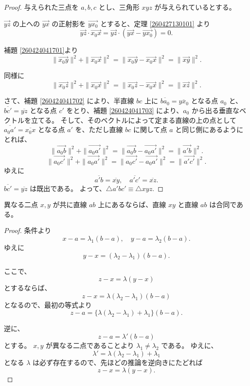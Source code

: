 \begin{proof}
  与えられた三点を \(a,b,c\) とし、三角形 \(xyz\) が与えられているとする。

  \(\overrightarrow{yz}\) の上への \(\overrightarrow{yx}\) の正射影を \(\overrightarrow{yx_0}\) とすると、定理 \ref{260427130101} より
  \[\overrightarrow{yz}\cdot\overrightarrow{x_0x}=\overrightarrow{yz}\cdot(\overrightarrow{yx}-\overrightarrow{yx_0})=0.\]

  補題 \ref{260424041701}より
  \[\|\overrightarrow{x_0y}\|^2+\|\overrightarrow{x_0x}\|^2=\|\overrightarrow{x_0y}-\overrightarrow{x_0x}\|^2=\|\overrightarrow{xy}\|^2.\]

  同様に
  \[\|\overrightarrow{x_0z}\|^2+\|\overrightarrow{x_0x}\|^2=\|\overrightarrow{x_0z}-\overrightarrow{x_0x}\|^2=\|\overrightarrow{xz}\|^2.\]

  さて、補題 \ref{260424041702} により、半直線 \(bc\) 上に \(\overline{ba_0}=\overline{yx_0}\) となる点 \(a_0\) と、\(\overline{bc'}=\overline{yz}\) となる点 \(c'\) をとり、補題 \ref{260424041703} により、\(a_0\) から出る垂直なベクトルを立てる。
  そして、そのベクトルによって定まる直線の上の点として \(\overline{a_0a'}=\overline{x_0x}\) となる点 \(a'\) を、ただし直線 \(bc\) に関して点 \(a\) と同じ側にあるようにとれば、
  \[\|\overrightarrow{a_0b}\|^2+\|\overrightarrow{a_0a'}\|^2=\|\overrightarrow{a_0b}-\overrightarrow{a_0a'}\|^2=\|\overrightarrow{a'b}\|^2.\]
  \[\|\overrightarrow{a_0c'}\|^2+\|\overrightarrow{a_0a'}\|^2=\|\overrightarrow{a_0c'}-\overrightarrow{a_0a'}\|^2=\|\overrightarrow{a'c'}\|^2.\]
  ゆえに
  \[\overline{a'b}=\overline{xy},\quad \overline{a'c'}=\overline{xz}.\]
  \(\overline{bc'}=\overline{yz}\) は既出である。
  よって、\(\triangle a'bc'\equiv\triangle xyz.\)
\end{proof}


\begin{lmm}\label{260424111401}
  異なる二点 \(x,y\) が共に直線 \(ab\) 上にあるならば、直線 \(xy\) と直線 \(ab\) は合同である。
\end{lmm}

\begin{proof}
  条件より
  \[x-a=\lambda_1(b-a),\quad y-a=\lambda_2(b-a).\]
  ゆえに
  \[y-x=(\lambda_2-\lambda_1)(b-a).\]

  ここで、
  \[z-x=\lambda(y-x)\]
  とするならば、
  \[z-x=\lambda(\lambda_2-\lambda_1)(b-a)\]
  となるので、最初の等式より
  \[z-a=\{\lambda(\lambda_2-\lambda_1)+\lambda_1\}(b-a).\]

  逆に、
  \[z-a=\lambda'(b-a)\]
  とする。
  \(x,y\) が異なる二点であることより \(\lambda_1\neq\lambda_2\) である。
  ゆえに、
  \[\lambda'=\lambda(\lambda_2-\lambda_1)+\lambda_1\]
  となる \(\lambda\) は必ず存在するので、先ほどの推論を逆向きにたどれば
  \[z-x=\lambda(y-x).\]
\end{proof}


